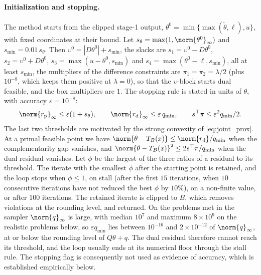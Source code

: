 \paragraph{Initialization and stopping.} The method starts from the clipped stage-1 output, $\theta^0 = \min\{\max(\tilde\theta, \ell), u\}$, with fixed coordinates at their bound. Let $s_\theta = \max(1, \norm{\theta^0}_\infty)$ and $s_{\min} = 0.01\,s_\theta$. Then $\upsilon^0 = |D\theta^0| + s_{\min}$, the slacks are $s_1 = \upsilon^0 - D\theta^0$, $s_2 = \upsilon^0 + D\theta^0$, $s_3 = \max(u - \theta^0, s_{\min})$ and $s_4 = \max(\theta^0 - \ell, s_{\min})$, all at least $s_{\min}$, the multipliers of the difference constraints are $\pi_1 = \pi_2 = \lambda/2$ (plus $10^{-8}$, which keeps them positive at $\lambda = 0$), so that the $\upsilon$-block starts dual feasible, and the box multipliers are $1$. The stopping rule is stated in units of $\theta$, with accuracy $\varepsilon = 10^{-8}$:
\[
\norm{r_{\mathrm p}}_\infty \le \varepsilon(1 + s_\theta), \qquad \norm{r_{\mathrm d}}_\infty \le \varepsilon\, q_{\min}, \qquad s^\top\pi \le \varepsilon^2 q_{\min}/2 .
\]
The last two thresholds are motivated by the strong convexity of \eqref{eq:joint_prox}. At a primal feasible point we have $\norm{\theta - T_B(x)} \le \norm{r_{\mathrm d}}/q_{\min}$ when the complementarity gap vanishes, and $\norm{\theta - T_B(x)}^2 \le 2s^\top\pi/q_{\min}$ when the dual residual vanishes. Let $\phi$ be the largest of the three ratios of a residual to its threshold. The iterate with the smallest $\phi$ after the starting point is retained, and the loop stops when $\phi \le 1$, on stall (after the first $15$ iterations, when $10$ consecutive iterations have not reduced the best $\phi$ by $10\%$), on a non-finite value, or after $100$ iterations. The retained iterate is clipped to $B$, which removes violations at the rounding level, and returned. On the problems met in the sampler $\norm{q}_\infty$ is large, with median $10^7$ and maximum $8\times10^9$ on the realistic problems below, so $\varepsilon q_{\min}$ lies between $10^{-16}$ and $2\times10^{-12}$ of $\norm{q}_\infty$, at or below the rounding level of $Q\theta + q$. The dual residual therefore cannot reach its threshold, and the loop usually ends at its numerical floor through the stall rule. The stopping flag is consequently not used as evidence of accuracy, which is established empirically below.

